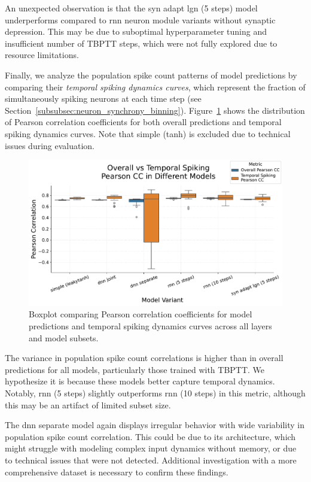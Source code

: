 An unexpected observation is that the syn adapt lgn (5 steps) model underperforms compared to rnn neuron module variants without synaptic depression. This may be due to suboptimal hyperparameter tuning and insufficient number of TBPTT steps, which were not fully explored due to resource limitations.

Finally, we analyze the population spike count patterns of model predictions by comparing their \emph{temporal spiking dynamics curves}, which represent the fraction of simultaneously spiking neurons at each time step (see Section~\ref{subsubsec:neuron_synchrony_binning}). Figure~\ref{fig:boxplot_models_overall_synchrony_pearson_comparison} shows the distribution of Pearson correlation coefficients for both overall predictions and temporal spiking dynamics curves. Note that simple (tanh) is excluded due to technical issues during evaluation.

\begin{figure}
    \centering
    \includegraphics[width=\linewidth]{img/plots/boxplot_model_comparison_synchrony_overall_pearson.pdf}
    \caption{Boxplot comparing Pearson correlation coefficients for model predictions and temporal spiking dynamics curves across all layers and model subsets.}
    \label{fig:boxplot_models_overall_synchrony_pearson_comparison}
\end{figure}

The variance in population spike count correlations is higher than in overall predictions for all models, particularly those trained with TBPTT. We hypothesize it is because these models better capture temporal dynamics. Notably, rnn (5 steps) slightly outperforms rnn (10 steps) in this metric, although this may be an artifact of limited subset size.

The dnn separate model again displays irregular behavior with wide variability in population spike count correlation. This could be due to its architecture, which might struggle with modeling complex input dynamics without memory, or due to technical issues that were not detected. Additional investigation with a more comprehensive dataset is necessary to confirm these findings.

